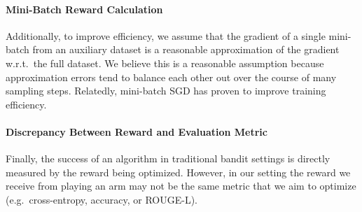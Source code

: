 \paragraph{Mini-Batch Reward Calculation}Additionally, to improve efficiency, we assume that the gradient of a single mini-batch from an auxiliary dataset is a reasonable approximation of the gradient w.r.t.\ the full dataset. We believe this is a reasonable assumption because approximation errors tend to balance each other out over the course of many sampling steps. Relatedly, mini-batch SGD has proven to improve training efficiency. %

\paragraph{Discrepancy Between Reward and Evaluation Metric}Finally, the success of an algorithm in traditional bandit settings is directly measured by the reward being optimized. However, in our setting the reward we receive from playing an arm may not be the same metric that we aim to optimize (e.g.\ cross-entropy, accuracy, or ROUGE-L).



